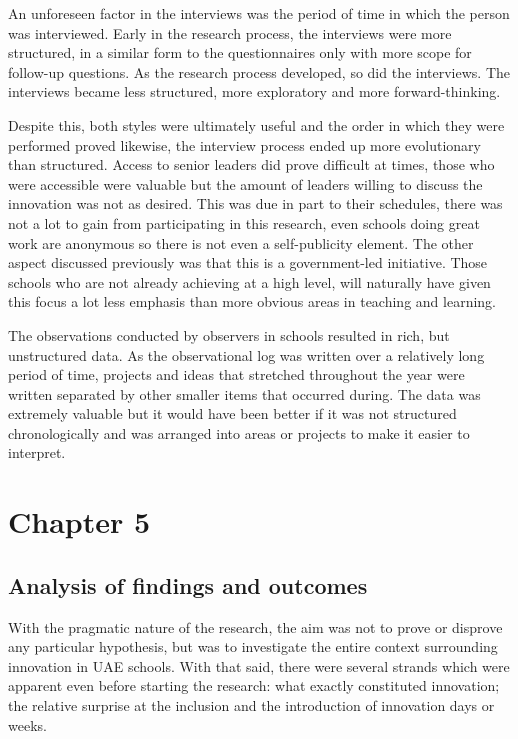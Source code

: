 \documentclass[11pt]{article}
\begin{document}
An unforeseen factor in the interviews was the period of time in which the person was interviewed. Early in the research process, the interviews were more structured, in a similar form to the questionnaires only with more scope for follow-up questions. As the research process developed, so did the interviews. The interviews became less structured, more exploratory and more forward-thinking.

Despite this, both styles were ultimately useful and the order in which they were performed proved likewise, the interview process ended up more evolutionary than structured. Access to senior leaders did prove difficult at times, those who were accessible were valuable but the amount of leaders willing to discuss the innovation was not as desired. This was due in part to their schedules, there was not a lot to gain from participating in this research, even schools doing great work are anonymous so there is not even a self-publicity element. The other aspect discussed previously was that this is a government-led initiative. Those schools who are not already achieving at a high level, will naturally have given this focus a lot less emphasis than more obvious areas in teaching and learning. 

The observations conducted by observers in schools resulted in rich, but unstructured data. As the observational log was written over a relatively long period of time, projects and ideas that stretched throughout the year were written separated by other smaller items that occurred during. The data was extremely valuable but it would have been better if it was not structured chronologically and was arranged into areas or projects to make it easier to interpret.



\section{Chapter 5}
\subsection{Analysis of findings and outcomes}
With the pragmatic nature of the research, the aim was not to prove or disprove any particular hypothesis, but was to investigate the entire context surrounding innovation in UAE schools. With that said, there were several strands which were apparent even before starting the research: what exactly constituted innovation; the relative surprise at the inclusion and the introduction of innovation days or weeks.
\end{document}
